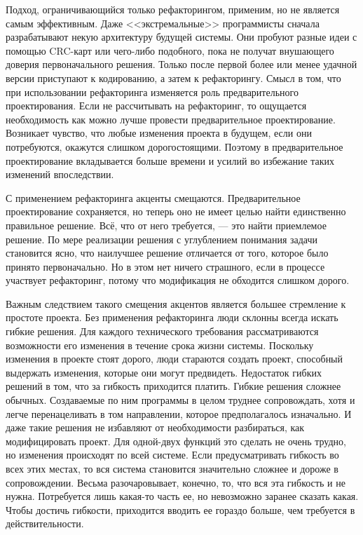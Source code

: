 \documentclass{../../text-style}
\begin{document}
Подход, ограничивающийся только рефакторингом, применим, но не является самым эффективным. Даже <<экстремальные>> программисты сначала разрабатывают некую архитектуру будущей системы. Они пробуют разные идеи с помощью CRC-карт или чего-либо подобного, пока не получат внушающего доверия первоначального решения. Только после первой более или менее удачной версии приступают к кодированию, а затем к рефакторингу. Смысл в том, что при использовании рефакторинга изменяется роль предварительного проектирования. Если не рассчитывать на рефакторинг, то ощущается необходимость как можно лучше провести предварительное проектирование. Возникает чувство, что любые изменения проекта в будущем, если они потребуются, окажутся слишком дорогостоящими. Поэтому в предварительное проектирование вкладывается больше времени и усилий во избежание таких изменений впоследствии.

С применением рефакторинга акценты смещаются. Предварительное проектирование сохраняется, но теперь оно не имеет целью найти единственно правильное решение. Всё, что от него требуется, --- это найти приемлемое решение. По мере реализации решения с углублением понимания задачи становится ясно, что наилучшее решение отличается от того, которое было принято первоначально. Но в этом нет ничего страшного, если в процессе участвует рефакторинг, потому что модификация не обходится слишком дорого.

Важным следствием такого смещения акцентов является большее стремление к простоте проекта. Без применения рефакторинга люди склонны всегда искать гибкие решения. Для каждого технического требования рассматриваются возможности его изменения в течение срока жизни системы. Поскольку изменения в проекте стоят дорого, люди стараются создать проект, способный выдержать изменения, которые они могут предвидеть. Недостаток гибких решений в том, что за гибкость приходится платить. Гибкие решения сложнее обычных. Создаваемые по ним программы в целом труднее сопровождать, хотя и легче перенацеливать в том направлении, которое предполагалось изначально. И даже такие решения не избавляют от необходимости разбираться, как модифицировать проект. Для одной-двух функций это сделать не очень трудно, но изменения происходят по всей системе. Если предусматривать гибкость во всех этих местах, то вся система становится значительно сложнее и дороже в сопровождении. Весьма разочаровывает, конечно, то, что вся эта гибкость и не нужна. Потребуется лишь какая-то часть ее, но невозможно заранее сказать какая. Чтобы достичь гибкости, приходится вводить ее гораздо больше, чем требуется в действительности.
\end{document}
